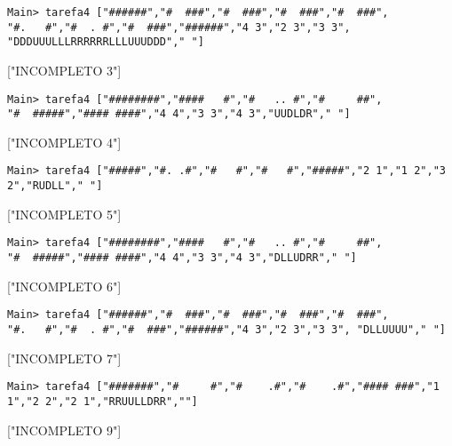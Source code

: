 \documentclass[a4paper,12pt]{report}
\begin{document}
\begin{tcolorbox}[width=\textwidth,colback={black},title={\sf Teste D.9:},outer arc=0mm,colupper=white]    
	{\footnotesize\tt *Main> tarefa4 ["\#\#\#\#\#\#","\#  \#\#\#","\#  \#\#\#","\#  \#\#\#","\#  \#\#\#", "\#.   \#","\#  . \#","\#  \#\#\#","\#\#\#\#\#\#","4 3","2 3","3 3", "DDDUUULLLRRRRRRLLLUUUDDD"," "]
		
		["INCOMPLETO 3"] }
\end{tcolorbox}


\begin{tcolorbox}[width=\textwidth,colback={black},title={\sf Teste D.10:},outer arc=0mm,colupper=white]    
	{\footnotesize\tt *Main> tarefa4 ["\#\#\#\#\#\#\#\#","\#\#\#\#   \#","\#   .. \#","\#     \#\#", "\#  \#\#\#\#\#","\#\#\#\# \#\#\#\#","4 4","3 3","4 3","UUDLDR"," "]
		
		["INCOMPLETO 4"] }
\end{tcolorbox} 



\begin{tcolorbox}[width=\textwidth,colback={black},title={\sf Teste D.11:},outer arc=0mm,colupper=white]    
	{\footnotesize\tt *Main> tarefa4 ["\#\#\#\#\#","\#. .\#","\#   \#","\#   \#","\#\#\#\#\#","2 1","1 2","3 2","RUDLL"," "]
		
		["INCOMPLETO 5"] }
\end{tcolorbox} 

\begin{tcolorbox}[width=\textwidth,colback={black},title={\sf Teste D.12:},outer arc=0mm,colupper=white]    
	{\footnotesize\tt *Main> tarefa4 ["\#\#\#\#\#\#\#\#","\#\#\#\#   \#","\#   .. \#","\#     \#\#", "\#  \#\#\#\#\#","\#\#\#\# \#\#\#\#","4 4","3 3","4 3","DLLUDRR"," "]
		
		["INCOMPLETO 6"] }
\end{tcolorbox} 

\begin{tcolorbox}[width=\textwidth,colback={black},title={\sf Teste D.13:},outer arc=0mm,colupper=white]    
	{\footnotesize\tt *Main> tarefa4 ["\#\#\#\#\#\#","\#  \#\#\#","\#  \#\#\#","\#  \#\#\#","\#  \#\#\#", "\#.   \#","\#  . \#","\#  \#\#\#","\#\#\#\#\#\#","4 3","2 3","3 3", "DLLUUUU"," "]
		
		["INCOMPLETO 7"] }
\end{tcolorbox}

\begin{tcolorbox}[width=\textwidth,colback={black},title={\sf Teste D.14:},outer arc=0mm,colupper=white]    
	{\footnotesize\tt *Main> tarefa4 ["\#\#\#\#\#\#\#","\#     \#","\#    .\#","\#    .\#","\#\#\#\# \#\#\#","1 1","2 2","2 1","RRUULLDRR",""]
		
		["INCOMPLETO 9"] }
\end{tcolorbox} 
\end{document}
